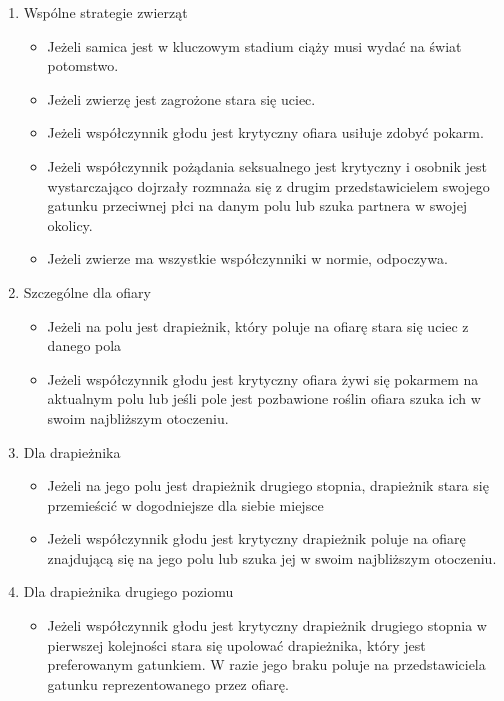 \begin{enumerate}
\item Wspólne strategie zwierząt
	\begin{itemize}
		\item Jeżeli samica jest w kluczowym stadium ciąży musi wydać na świat potomstwo.
		\item Jeżeli zwierzę jest zagrożone stara się uciec.
		\item Jeżeli współczynnik głodu jest krytyczny ofiara usiłuje zdobyć pokarm.
		\item Jeżeli współczynnik pożądania seksualnego jest krytyczny i osobnik jest wystarczająco dojrzały rozmnaża się z drugim przedstawicielem swojego gatunku przeciwnej płci na danym polu lub szuka partnera w swojej okolicy.
		\item Jeżeli zwierze ma wszystkie współczynniki w normie, odpoczywa.
	\end{itemize}
	
\item Szczególne dla ofiary
	\begin{itemize}
		\item Jeżeli na polu jest drapieżnik, który poluje na ofiarę stara się uciec z danego pola
		\item Jeżeli współczynnik głodu jest krytyczny ofiara żywi się pokarmem na aktualnym polu lub jeśli pole jest pozbawione roślin ofiara szuka ich w swoim najbliższym otoczeniu.
	\end{itemize}
	
\item Dla drapieżnika
	\begin{itemize}
		\item Jeżeli na jego polu jest drapieżnik drugiego stopnia, drapieżnik stara się przemieścić w dogodniejsze dla siebie miejsce
		\item Jeżeli współczynnik głodu jest krytyczny drapieżnik poluje na ofiarę znajdującą się na jego polu lub szuka jej w swoim najbliższym otoczeniu.
	\end{itemize}
	
\item Dla drapieżnika drugiego poziomu
	\begin{itemize}
		\item Jeżeli współczynnik głodu jest krytyczny drapieżnik drugiego stopnia w pierwszej kolejności stara się upolować drapieżnika, który jest preferowanym gatunkiem. W razie jego braku poluje na przedstawiciela gatunku reprezentowanego przez ofiarę.
	\end{itemize}
\end{enumerate}

